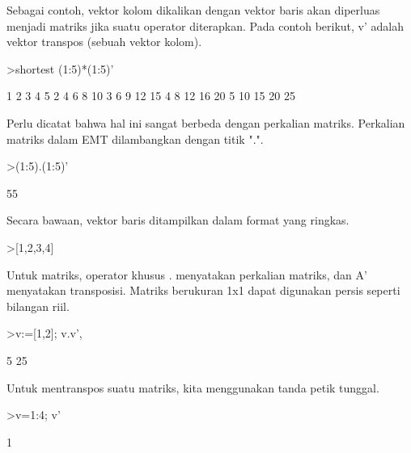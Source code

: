 \documentclass{article}
\newenvironment{eulernotebook}{\par}{\par}
\newenvironment{eulercomment}{\par\medskip}{\par\medskip}
\begin{document}
\begin{eulernotebook}
\begin{eulercomment}
\begin{eulercomment}
\begin{eulercomment}
\begin{eulercomment}
\begin{eulercomment}
\begin{eulercomment}
\begin{eulercomment}
Sebagai contoh, vektor kolom dikalikan dengan vektor baris akan
diperluas menjadi matriks jika suatu operator diterapkan. Pada contoh
berikut, v' adalah vektor transpos (sebuah vektor kolom).
\end{eulercomment}
\begin{eulerprompt}
>shortest (1:5)*(1:5)'
\end{eulerprompt}
\begin{euleroutput}
       1      2      3      4      5 
       2      4      6      8     10 
       3      6      9     12     15 
       4      8     12     16     20 
       5     10     15     20     25 
\end{euleroutput}
\begin{eulercomment}
Perlu dicatat bahwa hal ini sangat berbeda dengan perkalian matriks.
﻿Perkalian matriks dalam EMT dilambangkan dengan titik ".".
\end{eulercomment}
\begin{eulerprompt}
>(1:5).(1:5)'
\end{eulerprompt}
\begin{euleroutput}
  55
\end{euleroutput}
\begin{eulercomment}
Secara bawaan, vektor baris ditampilkan dalam format yang ringkas.
\end{eulercomment}
\begin{eulerprompt}
>[1,2,3,4]
\end{eulerprompt}
\begin{euleroutput}
  [1,  2,  3,  4]
\end{euleroutput}
\begin{eulercomment}
Untuk matriks, operator khusus . menyatakan perkalian matriks, dan A'
menyatakan transposisi. Matriks berukuran 1x1 dapat digunakan persis
seperti bilangan riil.
\end{eulercomment}
\begin{eulerprompt}
>v:=[1,2]; v.v', %
\end{eulerprompt}
\begin{euleroutput}
  5
  25
\end{euleroutput}
\begin{eulercomment}
Untuk mentranspos suatu matriks, kita menggunakan tanda petik tunggal.
\end{eulercomment}
\begin{eulerprompt}
>v=1:4; v'
\end{eulerprompt}
\begin{euleroutput}
              1 

\end{euleroutput}
\end{eulercomment}
\end{eulercomment}
\end{eulercomment}
\end{eulercomment}
\end{eulercomment}
\end{eulercomment}
\end{eulernotebook}
\end{document}
